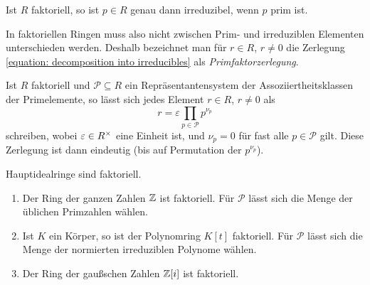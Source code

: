 \begin{lemma}
  Ist $R$ faktoriell, so ist $p \in R$ genau dann irreduzibel, wenn $p$ prim ist.
\end{lemma}

In faktoriellen Ringen muss also nicht zwischen Prim- und irreduziblen Elementen unterschieden werden.
Deshalb bezeichnet man für $r \in R$, $r \neq 0$ die Zerlegung \eqref{equation: decomposition into irreducibles} als \emph{Primfaktorzerlegung}.

\begin{remark}
  Ist $R$ faktoriell und $\mathcal{P} \subseteq R$ ein Repräsentantensystem der Assoziiertheitsklassen der Primelemente, so lässt sich jedes Element $r \in R$, $r \neq 0$ als
  \[
    r = \varepsilon \prod_{p \in \mathcal{P}} p^{\nu_p}
  \]
  schreiben, wobei $\varepsilon \in R^{\times}$ eine Einheit ist, und $\nu_p = 0$ für fast alle $p \in \mathcal{P}$ gilt.
  Diese Zerlegung ist dann eindeutig (bis auf Permutation der $p^{\nu_p}$).
\end{remark}


\begin{proposition}
  Hauptidealringe sind faktoriell.
\end{proposition}

\begin{example}
  \begin{enumerate}
    \item
      Der Ring der ganzen Zahlen $\mathbb{Z}$ ist faktoriell.
      Für $\mathcal{P}$ lässt sich die Menge der üblichen Primzahlen wählen.
    \item
      Ist $K$ ein Körper, so ist der Polynomring $K[t]$ faktoriell.
      Für $\mathcal{P}$ lässt sich die Menge der normierten irreduziblen Polynome wählen.
    \item
      Der Ring der gaußschen Zahlen $\mathbb{Z}[i]$ ist faktoriell.
  \end{enumerate}
\end{example}


